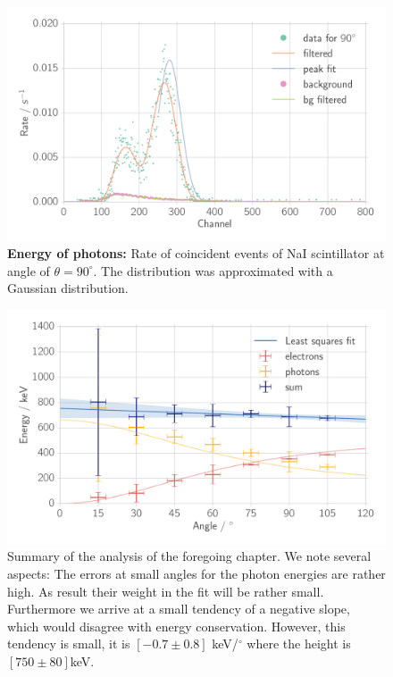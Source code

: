 \begin{figure}[htpb]
    \centering
    \includegraphics[width=0.9\linewidth]{./analysis/figures/coin_na_90}
\caption{\textbf{Energy of photons:} Rate of coincident events of 
        NaI scintillator at angle of $\theta = 90^\circ$. The distribution 
    was approximated with a Gaussian distribution. }
\label{fig:coin_na_90}
\end{figure}


\begin{figure}[htpb]
    \centering
    \includegraphics[width=0.9\linewidth]{./analysis/figures/energy_conservation}
    \caption{Summary of the analysis of the foregoing chapter. We note several aspects:
    The errors at small angles for the photon energies are rather high. 
    As result their weight in the fit will
    be rather small. Furthermore we arrive at a small tendency of a negative slope, which
    would disagree with energy conservation. However, this tendency is small, it is
    $[-0.7 \pm 0.8]$ keV/$^\circ$ where the height is $[750 \pm 80]$keV.}
\label{fig:energy_conservation}
\end{figure}

